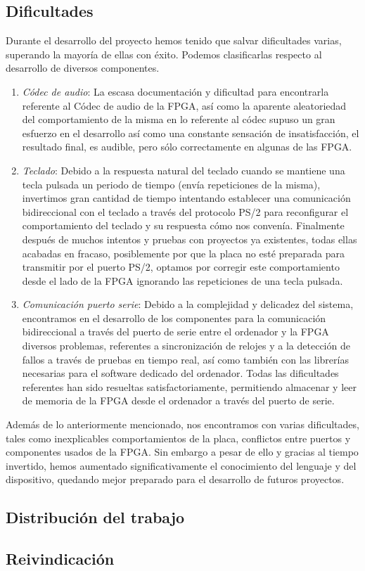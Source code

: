 \documentclass{article}
\begin{document}
\subsection{Dificultades}
	Durante el desarrollo del proyecto hemos tenido que salvar dificultades varias, superando la mayoría de ellas con éxito. Podemos clasificarlas respecto al desarrollo de diversos componentes.
\begin{enumerate}
	\item {\itshape Códec de audio}: La escasa documentación y dificultad para encontrarla referente al Códec de audio de la FPGA, así como la aparente aleatoriedad del comportamiento de la misma en lo referente al códec supuso un gran esfuerzo en el desarrollo así como una constante sensación de insatisfacción, el resultado final, es audible, pero sólo correctamente en algunas de las FPGA.
	\item {\itshape Teclado}: Debido a la respuesta natural del teclado cuando se mantiene una tecla pulsada un periodo de tiempo (envía repeticiones de la misma), invertimos gran cantidad de tiempo intentando establecer una comunicación bidireccional con el teclado a través del protocolo PS/2 para reconfigurar el comportamiento del teclado y su respuesta cómo nos convenía. Finalmente después de muchos intentos y pruebas con proyectos ya existentes, todas ellas acabadas en fracaso, posiblemente por que la placa no esté preparada para transmitir por el puerto PS/2, optamos por corregir este comportamiento desde el lado de la FPGA ignorando las repeticiones de una tecla pulsada.
	\item {\itshape Comunicación puerto serie}:
	Debido a la complejidad y delicadez del sistema, encontramos en el desarrollo de los componentes para la comunicación bidireccional a través del puerto de serie entre el ordenador y la FPGA diversos problemas, referentes a sincronización de relojes y a la detección de fallos a través de pruebas en tiempo real, así como también con las librerías necesarias para el software dedicado del ordenador.
	Todas las dificultades referentes han sido resueltas satisfactoriamente, permitiendo almacenar y leer de memoria de la FPGA desde el ordenador a través del puerto de serie.
\end{enumerate}
Además de lo anteriormente mencionado, nos encontramos con varias dificultades, tales como inexplicables comportamientos de la placa, conflictos entre puertos y componentes usados de la FPGA.
Sin embargo a pesar de ello y gracias al tiempo invertido, hemos aumentado significativamente el conocimiento del lenguaje y del dispositivo, quedando mejor preparado para el desarrollo de futuros proyectos.
\subsection{Distribución del trabajo}

\subsection{Reivindicación}

\newpage
{} {}


\end{document}
